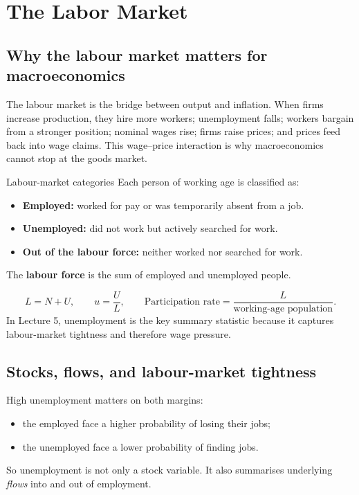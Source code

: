 
\section{The Labor Market}

\subsection{Why the labour market matters for macroeconomics}

The labour market is the bridge between output and inflation. When firms increase production, they hire more workers; unemployment falls; workers bargain from a stronger position; nominal wages rise; firms raise prices; and prices feed back into wage claims. This wage--price interaction is why macroeconomics cannot stop at the goods market.

\begin{definition}{Labour-market categories}{}
Each person of working age is classified as:
\begin{itemize}[leftmargin=1.5em]
\item \textbf{Employed:} worked for pay or was temporarily absent from a job.
\item \textbf{Unemployed:} did not work but actively searched for work.
\item \textbf{Out of the labour force:} neither worked nor searched for work.
\end{itemize}
The \textbf{labour force} is the sum of employed and unemployed people.
\end{definition}

\begin{keyformula}[title={Key Formula: Core labour-market rates}]
\[
L=N+U,
\qquad
u=\frac{U}{L},
\qquad
\text{Participation rate}=\frac{L}{\text{working-age population}}.
\]
In Lecture 5, unemployment is the key summary statistic because it captures labour-market tightness and therefore wage pressure.
\end{keyformula}

\subsection{Stocks, flows, and labour-market tightness}

High unemployment matters on both margins:
\begin{itemize}[leftmargin=1.5em]
\item the employed face a higher probability of losing their jobs;
\item the unemployed face a lower probability of finding jobs.
\end{itemize}
So unemployment is not only a stock variable. It also summarises underlying \emph{flows} into and out of employment.


